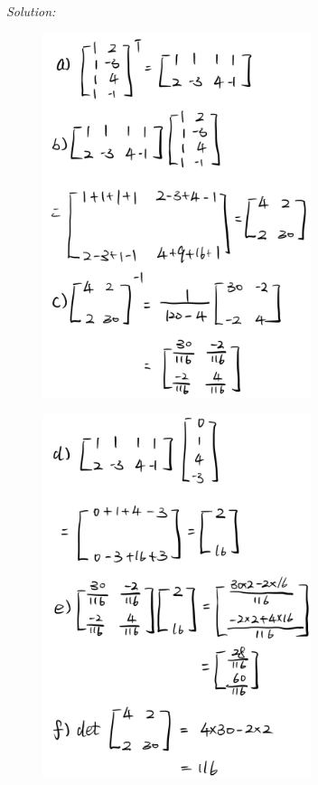 \documentclass{article}
\newenvironment{solution}
    {\textit{Solution:}}
    {}
\begin{document}
\begin{solution}
	\begin{figure}[h]
		\centering
		\includegraphics[width=0.7\textwidth]{figure1_Rplot.jpg}
	\end{figure}
\newpage
	\begin{figure}[h]
		\centering
		\includegraphics[width=0.7\textwidth]{figure2_Rplot.jpg}
	\end{figure}
\end{solution}
\end{document}
